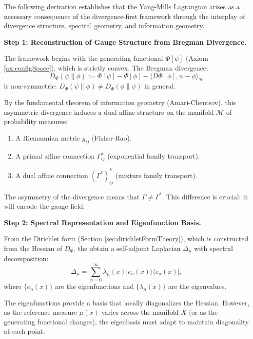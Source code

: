 
The following derivation establishes that the Yang-Mills Lagrangian arises as a necessary consequence of the divergence-first framework through the interplay of divergence structure, spectral geometry, and information geometry.

\textbf{Step 1: Reconstruction of Gauge Structure from Bregman Divergence.}

The framework begins with the generating functional $\Phi[\psi]$ (Axiom \ref{ax:configSpace}), which is strictly convex. The Bregman divergence:
\begin{equation}
D_\Phi(\psi \| \phi) := \Phi[\psi] - \Phi[\phi] - \langle D\Phi[\phi], \psi - \phi \rangle_{\mathcal{H}}
\end{equation}
is non-symmetric: $D_\Phi(\psi \| \phi) \neq D_\Phi(\phi \| \psi)$ in general.

By the fundamental theorem of information geometry (Amari-Chentsov), this asymmetric divergence induces a dual-affine structure on the manifold $\mathcal{M}$ of probability measures:
\begin{enumerate}
\item A Riemannian metric $g_{ij}$ (Fisher-Rao).
\item A primal affine connection $\Gamma^k_{ij}$ (exponential family transport).
\item A dual affine connection $(\Gamma^*)^k_{ij}$ (mixture family transport).
\end{enumerate}

The asymmetry of the divergence means that $\Gamma \neq \Gamma^*$. This difference is crucial: it will encode the gauge field.

\textbf{Step 2: Spectral Representation and Eigenfunction Basis.}

From the Dirichlet form (Section \ref{sec:dirichletFormTheory}), which is constructed from the Hessian of $D_\Phi$, the obtain a self-adjoint Laplacian $\Delta_\mu$ with spectral decomposition:
\begin{equation}
\Delta_\mu = \sum_{n=0}^\infty \lambda_n(x) |e_n(x)\rangle \langle e_n(x)|,
\end{equation}
where $\{e_n(x)\}$ are the eigenfunctions and $\{\lambda_n(x)\}$ are the eigenvalues.

The eigenfunctions provide a basis that locally diagonalizes the Hessian. However, as the reference measure $\mu(x)$ varies across the manifold $X$ (or as the generating functional changes), the eigenbasis must adapt to maintain diagonality at each point.

